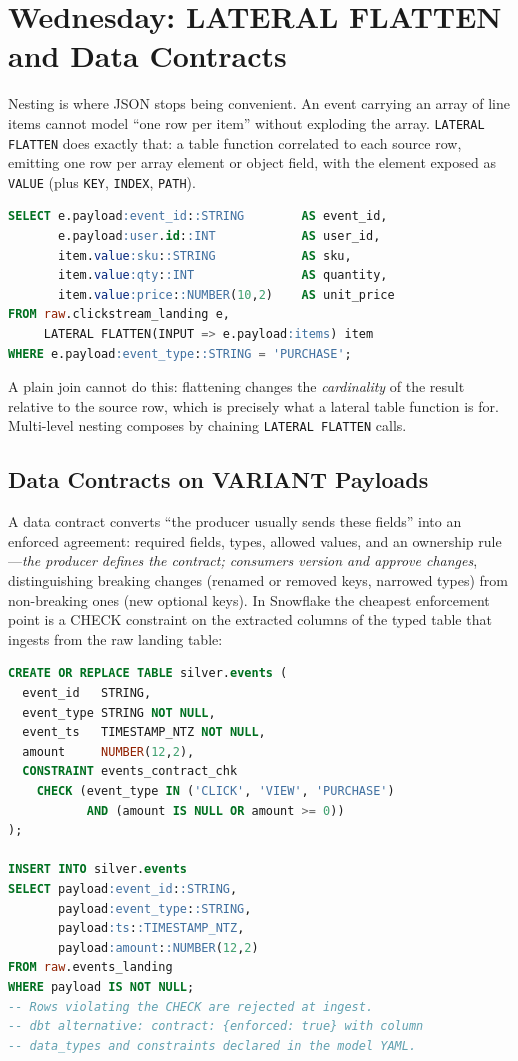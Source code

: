 \section{Wednesday: LATERAL FLATTEN and Data Contracts}
Nesting is where JSON stops being convenient. An event carrying an array of line items cannot model ``one row per item'' without exploding the array. \texttt{LATERAL FLATTEN} does exactly that: a table function correlated to each source row, emitting one row per array element or object field, with the element exposed as \texttt{VALUE} (plus \texttt{KEY}, \texttt{INDEX}, \texttt{PATH}).

\begin{lstlisting}[language=SQL, caption={Flattening nested line items into tabular rows}]
SELECT e.payload:event_id::STRING        AS event_id,
       e.payload:user.id::INT            AS user_id,
       item.value:sku::STRING            AS sku,
       item.value:qty::INT               AS quantity,
       item.value:price::NUMBER(10,2)    AS unit_price
FROM raw.clickstream_landing e,
     LATERAL FLATTEN(INPUT => e.payload:items) item
WHERE e.payload:event_type::STRING = 'PURCHASE';
\end{lstlisting}

A plain join cannot do this: flattening changes the \emph{cardinality} of the result relative to the source row, which is precisely what a lateral table function is for. Multi-level nesting composes by chaining \texttt{LATERAL FLATTEN} calls.

\subsection{Data Contracts on VARIANT Payloads}
A data contract converts ``the producer usually sends these fields'' into an enforced agreement: required fields, types, allowed values, and an ownership rule---\emph{the producer defines the contract; consumers version and approve changes}, distinguishing breaking changes (renamed or removed keys, narrowed types) from non-breaking ones (new optional keys). In Snowflake the cheapest enforcement point is a CHECK constraint on the extracted columns of the typed table that ingests from the raw landing table:

\begin{lstlisting}[language=SQL, caption={Contract enforcement on extracted VARIANT fields}]
CREATE OR REPLACE TABLE silver.events (
  event_id   STRING,
  event_type STRING NOT NULL,
  event_ts   TIMESTAMP_NTZ NOT NULL,
  amount     NUMBER(12,2),
  CONSTRAINT events_contract_chk
    CHECK (event_type IN ('CLICK', 'VIEW', 'PURCHASE')
           AND (amount IS NULL OR amount >= 0))
);

INSERT INTO silver.events
SELECT payload:event_id::STRING,
       payload:event_type::STRING,
       payload:ts::TIMESTAMP_NTZ,
       payload:amount::NUMBER(12,2)
FROM raw.events_landing
WHERE payload IS NOT NULL;
-- Rows violating the CHECK are rejected at ingest.
-- dbt alternative: contract: {enforced: true} with column
-- data_types and constraints declared in the model YAML.
\end{lstlisting}

